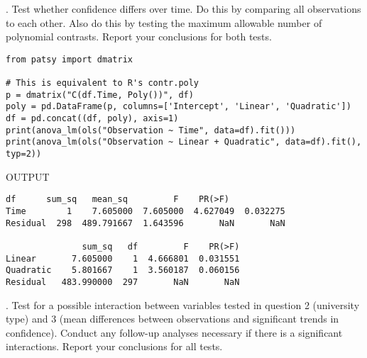 \documentclass[onecolumn,10pt]{jhwhw}
\begin{document}
. Test whether confidence differs over time. Do this by comparing all observations to each other. Also do this by testing the maximum allowable number of polynomial contrasts. Report your conclusions for both tests.

\begin{lstlisting}
from patsy import dmatrix

# This is equivalent to R's contr.poly
p = dmatrix("C(df.Time, Poly())", df)
poly = pd.DataFrame(p, columns=['Intercept', 'Linear', 'Quadratic'])
df = pd.concat((df, poly), axis=1)
print(anova_lm(ols("Observation ~ Time", data=df).fit()))
print(anova_lm(ols("Observation ~ Linear + Quadratic", data=df).fit(), typ=2))
\end{lstlisting}
\noindent OUTPUT
\begin{lstlisting}[language={}]
           df      sum_sq   mean_sq         F    PR(>F)
Time        1    7.605000  7.605000  4.627049  0.032275
Residual  298  489.791667  1.643596       NaN       NaN

               sum_sq   df         F    PR(>F)
Linear       7.605000    1  4.666801  0.031551
Quadratic    5.801667    1  3.560187  0.060156
Residual   483.990000  297       NaN       NaN
\end{lstlisting}

. Test for a possible interaction between variables tested in question 2 (university type) and 3 (mean differences between observations and significant trends in confidence). Conduct any follow-up analyses necessary if there is a significant interactions. Report your conclusions for all tests.
\end{document}

